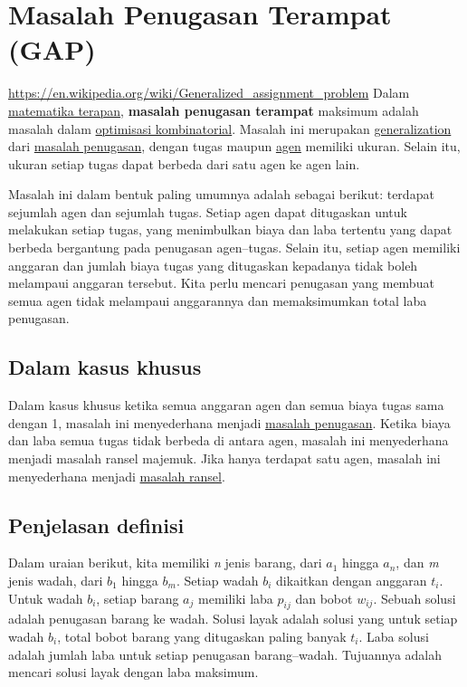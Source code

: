 \section{Masalah Penugasan Terampat (GAP)}
\url{https://en.wikipedia.org/wiki/Generalized_assignment_problem}
Dalam \href{applied_mathematics}{matematika terapan},
\textbf{masalah penugasan terampat} maksimum adalah masalah dalam
\href{combinatorial_optimization}{optimisasi kombinatorial}. Masalah ini
merupakan \url{generalization} dari
\href{assignment_problem}{masalah penugasan}, dengan tugas maupun
\href{Agent-based_model}{agen} memiliki ukuran. Selain itu, ukuran setiap
tugas dapat berbeda dari satu agen ke agen lain.

Masalah ini dalam bentuk paling umumnya adalah sebagai berikut: terdapat sejumlah
agen dan sejumlah tugas. Setiap agen dapat ditugaskan untuk melakukan
setiap tugas, yang menimbulkan biaya dan laba tertentu yang dapat berbeda bergantung pada
penugasan agen--tugas. Selain itu, setiap agen memiliki anggaran dan jumlah
biaya tugas yang ditugaskan kepadanya tidak boleh melampaui anggaran tersebut.
Kita perlu mencari penugasan yang membuat semua agen tidak melampaui
anggarannya dan memaksimumkan total laba penugasan.

\hypertarget{in-special-cases}{%
\subsection{Dalam kasus khusus}\label{in-special-cases}}

Dalam kasus khusus ketika semua anggaran agen dan semua biaya tugas
sama dengan 1, masalah ini menyederhana menjadi
\href{assignment_problem}{masalah penugasan}. Ketika biaya dan
laba semua tugas tidak berbeda di antara agen, masalah ini
menyederhana menjadi masalah ransel majemuk. Jika hanya terdapat satu agen,
masalah ini menyederhana menjadi \href{knapsack_problem}{masalah
ransel}.

\hypertarget{explanation-of-definition}{%
\subsection{Penjelasan definisi}\label{explanation-of-definition}}

Dalam uraian berikut, kita memiliki \emph{n} jenis barang, dari \(a_1\) hingga
\(a_n\), dan \emph{m} jenis wadah, dari \(b_1\) hingga \(b_m\). Setiap wadah
\(b_i\) dikaitkan dengan anggaran \(t_i\). Untuk wadah \(b_i\), setiap
barang \(a_j\) memiliki laba \(p_{ij}\) dan bobot \(w_{ij}\). Sebuah solusi
adalah penugasan barang ke wadah. Solusi layak adalah solusi
yang untuk setiap wadah \(b_i\), total bobot barang yang ditugaskan paling
banyak \(t_i\). Laba solusi adalah jumlah laba untuk setiap
penugasan barang--wadah. Tujuannya adalah mencari solusi layak dengan laba
maksimum.

